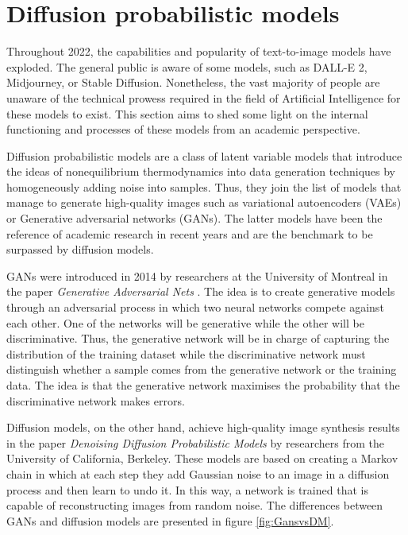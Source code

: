 \section{Diffusion probabilistic models} \label{Dprobabilistic}

Throughout 2022, the capabilities and popularity of text-to-image models have exploded. The general public is aware of some models, such as DALL-E 2, Midjourney, or Stable Diffusion. Nonetheless, the vast majority of people are unaware of the technical prowess required in the field of Artificial Intelligence for these models to exist. This section aims to shed some light on the internal functioning and processes of these models from an academic perspective.

Diffusion probabilistic models are a class of latent variable models that introduce the ideas of nonequilibrium thermodynamics into data generation techniques by homogeneously adding noise into samples. Thus, they join the list of models that manage to generate high-quality images such as variational autoencoders (VAEs) or Generative adversarial networks (GANs). The latter models have been the reference of academic research in recent years and are the benchmark to be surpassed by diffusion models. 

GANs were introduced in 2014 by researchers at the University of Montreal in the paper \textit{Generative Adversarial Nets} \cite{goodfellow2020generative}. The idea is to create generative models through an adversarial process in which two neural networks compete against each other.  One of the networks will be generative while the other will be discriminative. Thus, the generative network will be in charge of capturing the distribution of the training dataset while the discriminative network must distinguish whether a sample comes from the generative network or the training data. The idea is that the generative network maximises the probability that the discriminative network makes errors. 

Diffusion models, on the other hand, achieve high-quality image synthesis results in the paper \textit{Denoising Diffusion Probabilistic Models} \cite{ho2020denoising} by researchers from the University of California, Berkeley. These models are based on creating a Markov chain in which at each step they add Gaussian noise to an image in a diffusion process and then learn to undo it. In this way, a network is trained that is capable of reconstructing images from random noise. The differences between GANs and diffusion models are presented in figure \ref{fig:GansvsDM}.

